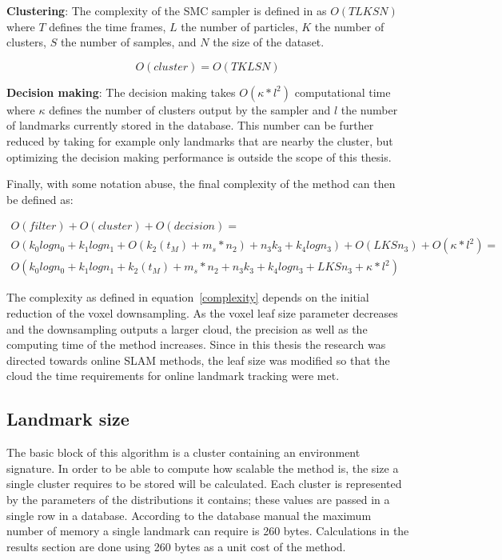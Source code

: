 \documentclass[twoside,hidelinks]{article}
\begin{document}
\textbf{Clustering}: The complexity of the SMC sampler is defined in \cite{smcddp} as $O(TLKSN)$ where $T$ defines the time frames, $L$ the number of particles, $K$ the number of clusters, $S$ the number of samples, and $N$ the size of the dataset. 

$$
O(cluster) = O(TKLSN)
$$

\textbf{Decision making}: The decision making takes $ O(\kappa * l^2) $ computational time where $\kappa$ defines the number of clusters output by the sampler and $l$ the number of landmarks currently stored in the database. This number can be further reduced by taking for example only landmarks that are nearby the cluster, but optimizing the decision making performance is outside the scope of this thesis.


Finally, with some notation abuse, the final complexity of the method can then be defined as:

\begin{equation} \label{complexity}
\begin{split}
O(filter) + O(cluster) + O(decision) = \\
O(k_{0}logn_{0} + k_{1}logn_{1} + O(k_{2}(t_M)+ m_s*n_{2}) + n_{3}k_{3} + k_{4}logn_{3} ) + O(LKSn_3) + O(\kappa * l^2)=\\
O(k_{0}logn_{0} + k_{1}logn_{1} + k_{2}(t_M)+ m_s*n_{2} + n_{3}k_{3} + k_{4}logn_{3} + LKSn_3 + \kappa * l^2)
\end{split}
\end{equation}

The complexity as defined in equation~\ref{complexity} depends on the initial reduction of the voxel downsampling. As the voxel leaf size parameter decreases and the downsampling outputs a larger cloud, the precision as well as the computing time of the method increases. Since in this thesis the research was directed towards online SLAM methods, the leaf size was modified so that the cloud the time requirements for online landmark tracking were met.

\subsection{Landmark size}


The basic block of this algorithm is a cluster containing an environment signature. In order to be able to compute how scalable the method is, the size a single cluster requires to be stored will be calculated. Each cluster is represented by the parameters of the distributions it contains; these values are passed in a single row in a database\cite{sqlite}. According to the database manual the maximum number of memory a single landmark can require is 260 bytes. Calculations in the results section are done using 260 bytes as a unit cost of the method. 
\end{document}
